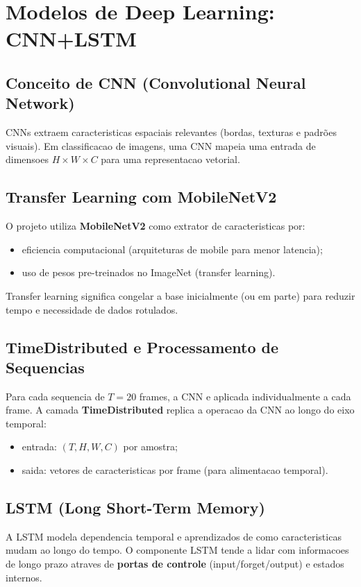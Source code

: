 \section{Modelos de Deep Learning: CNN+LSTM}

\subsection{Conceito de CNN (Convolutional Neural Network)}
CNNs extraem caracteristicas espaciais relevantes (bordas, texturas e padrões visuais). Em classificacao de imagens, uma CNN mapeia uma entrada de dimensoes $H \times W \times C$ para uma representacao vetorial.

\subsection{Transfer Learning com MobileNetV2}
O projeto utiliza \textbf{MobileNetV2} como extrator de caracteristicas por:
\begin{itemize}
  \item eficiencia computacional (arquiteturas de mobile para menor latencia);
  \item uso de pesos pre-treinados no ImageNet (transfer learning).
\end{itemize}
Transfer learning significa congelar a base inicialmente (ou em parte) para reduzir tempo e necessidade de dados rotulados.

\subsection{TimeDistributed e Processamento de Sequencias}
Para cada sequencia de $T=20$ frames, a CNN e aplicada individualmente a cada frame. A camada \textbf{TimeDistributed} replica a operacao da CNN ao longo do eixo temporal:
\begin{itemize}
  \item entrada: $(T, H, W, C)$ por amostra;
  \item saida: vetores de caracteristicas por frame (para alimentacao temporal).
\end{itemize}

\subsection{LSTM (Long Short-Term Memory)}
A LSTM modela dependencia temporal e aprendizados de como caracteristicas mudam ao longo do tempo. O componente LSTM tende a lidar com informacoes de longo prazo atraves de \textbf{portas de controle} (input/forget/output) e estados internos.

